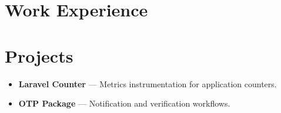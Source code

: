 \documentclass[11pt,a4paper]{article}
\begin{document}

\section*{Work Experience}

\section*{Projects}
\begin{itemize}
  \item \textbf{Laravel Counter} --- Metrics instrumentation for application counters.
  \item \textbf{OTP Package} --- Notification and verification workflows.
\end{itemize}

\end{document}
